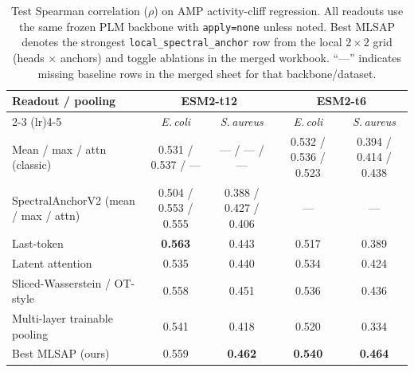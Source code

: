 \begin{table}[t]
  \centering
  \small
  \caption{Test Spearman correlation ($\rho$) on AMP activity-cliff regression. All readouts use the same frozen PLM backbone with \texttt{apply=none} unless noted. Best MLSAP denotes the strongest \texttt{local\_spectral\_anchor} row from the local $2\times2$ grid (heads $\times$ anchors) and toggle ablations in the merged workbook. ``---'' indicates missing baseline rows in the merged sheet for that backbone/dataset.}
  \label{tab:main}
  \begin{tabular}{lcccc}
    \toprule
    Readout / pooling & \multicolumn{2}{c}{ESM2-t12} & \multicolumn{2}{c}{ESM2-t6} \\
    \cmidrule(lr){2-3} \cmidrule(lr){4-5}
    & \textit{E.\,coli} & \textit{S.\,aureus} & \textit{E.\,coli} & \textit{S.\,aureus} \\
    \midrule
    Mean / max / attn (classic) & 0.531 / 0.537 / --- & --- / --- / --- & 0.532 / 0.536 / 0.523 & 0.394 / 0.414 / 0.438 \\
    SpectralAnchorV2 (mean / max / attn) & 0.504 / 0.553 / 0.555 & 0.388 / 0.427 / 0.406 & --- & --- \\
    Last-token & \textbf{0.563} & 0.443 & 0.517 & 0.389 \\
    Latent attention & 0.535 & 0.440 & 0.534 & 0.424 \\
    Sliced-Wasserstein / OT-style & 0.558 & 0.451 & 0.536 & 0.436 \\
    Multi-layer trainable pooling & 0.541 & 0.418 & 0.520 & 0.334 \\
    Best MLSAP (ours) & 0.559 & \textbf{0.462} & \textbf{0.540} & \textbf{0.464} \\
    \bottomrule
  \end{tabular}
\end{table}
